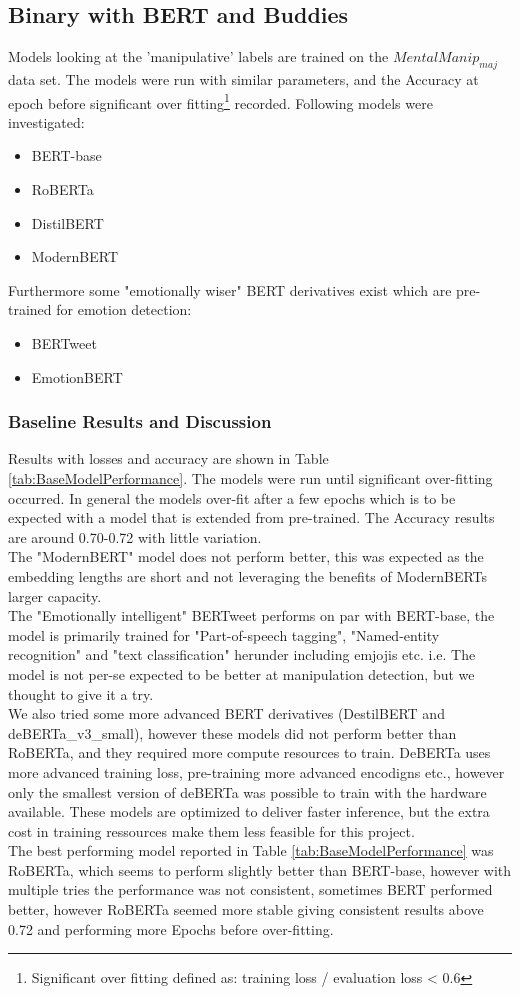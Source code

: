 \documentclass[
	letterpaper, %
	12pt, %
	unnumberedsections, %
	twoside, %
]{LTJournalArticle}
\begin{document}
\subsection{Binary with BERT and Buddies}
Models looking at the 'manipulative' labels are trained on the $MentalManip_{maj}$ data set. The models were run with similar parameters, and the Accuracy at epoch before significant over fitting\footnote{Significant over fitting defined as: training loss / evaluation loss < 0.6} recorded. Following models were investigated:
\begin{itemize}
	\item BERT-base
	\item RoBERTa
	\item DistilBERT
	\item ModernBERT
\end{itemize}
Furthermore some "emotionally wiser" BERT derivatives exist which are pre-trained for emotion detection:
\begin{itemize}
	\item BERTweet
	\item EmotionBERT
\end{itemize}

\subsubsection{Baseline Results and Discussion}
Results with losses and accuracy are shown in Table \ref{tab:BaseModelPerformance}. The models were run until significant over-fitting occurred. In general the models over-fit after a few epochs which is to be expected with a model that is extended from pre-trained. The Accuracy results are around 0.70-0.72 with little variation.\\
The "ModernBERT" model does not perform better, this was expected as the embedding lengths are short and not leveraging the benefits of ModernBERTs larger capacity. \\
The "Emotionally intelligent" BERTweet performs on par with BERT-base, the model is primarily trained for "Part-of-speech tagging", "Named-entity recognition" and "text classification" \cite{BERTweet} herunder including emjojis etc. i.e. The model is not per-se expected to be better at manipulation detection, but we thought to give it a try. \\
We also tried some more advanced BERT derivatives (DestilBERT and deBERTa\_v3\_small), however these models did not perform better than RoBERTa, and they required more compute resources to train. DeBERTa uses more advanced training loss, pre-training more advanced encodigns etc.\cite{DeBERTaV3}, however only the smallest version of deBERTa was possible to train with the hardware available. These models are optimized to deliver faster inference, but the extra cost in training ressources make them less feasible for this project. \\
The best performing model reported in Table \ref{tab:BaseModelPerformance} was RoBERTa, which seems to perform slightly better than BERT-base, however with multiple tries the performance was not consistent, sometimes BERT performed better, however RoBERTa seemed more stable giving consistent results above 0.72 and performing more Epochs before over-fitting.
\end{document}
